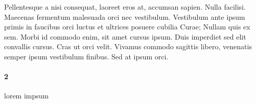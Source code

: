 
Pellentesque a nisi consequat, laoreet eros at, accumsan sapien. Nulla facilisi. Maecenas fermentum malesuada orci nec vestibulum. Vestibulum ante ipsum primis in faucibus orci luctus et ultrices posuere cubilia Curae; Nullam quis ex sem. Morbi id commodo enim, sit amet cursus ipsum. Duis imperdiet sed elit convallis cursus. Cras ut orci velit. Vivamus commodo sagittis libero, venenatis semper ipsum vestibulum finibus. Sed at ipsum orci.
\paragraph{2}
lorem impsum